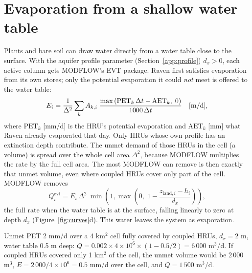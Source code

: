 \section{Evaporation from a shallow water table}\label{ch:et}
Plants and bare soil can draw water directly from a water table close to the surface. With the aquifer profile parameter  (Section~\ref{app:profile})
$d_x>0$, each active column gets MODFLOW's EVT package. Raven first satisfies evaporation from its own stores; only the
potential evaporation it could \emph{not} meet is offered to the water table:
\begin{equation}
E_i=\frac{1}{\Delta^2}\sum_kA_{k,i}\;\frac{\max\left(\mathrm{PET}_k\,\Delta t-\mathrm{AET}_k,\;0\right)}{1000\,\Delta t}\quad[\mathrm{m/d}],
\end{equation}
where $\mathrm{PET}_k$ [mm/d] is the HRU's potential evaporation and $\mathrm{AET}_k$ [mm] what Raven already evaporated
that day. Only HRUs whose own profile has an extinction depth contribute. The unmet demand of those HRUs in the cell (a volume) is spread over the whole cell area $\Delta^2$, because MODFLOW
multiplies the rate by the full cell area. The most MODFLOW can remove is then exactly that unmet volume, even where coupled
HRUs cover only part of the cell. MODFLOW removes
\begin{equation}
Q^{\mathrm{evt}}_i=E_i\,\Delta^2\;\min\!\left(1,\max\!\left(0,\;1-\frac{z_{\mathrm{land},i}-h_i}{d_x}\right)\right),
\end{equation}
the full rate when the water table is at the surface, falling linearly to zero at depth $d_x$ (Figure~\ref{fig:curves}d).
This water leaves the system as evaporation.
\begin{example}
Unmet PET 2 mm/d over a 4 km$^2$ cell fully covered by coupled HRUs, $d_x=2$ m, water table 0.5 m deep:
$Q=0.002\times4\times10^6\times(1-0.5/2)=6\,000$ m$^3$/d. If coupled HRUs covered only 1 km$^2$ of the cell, the unmet volume
would be 2\,000 m$^3$, $E=2\,000/4\times10^6=0.5$ mm/d over the cell, and $Q=1\,500$ m$^3$/d.
\end{example}


